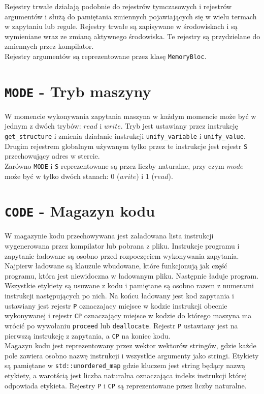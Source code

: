 Rejestry trwałe działają podobnie do rejestrów tymczasowych i rejestrów argumentów i służą do pamiętania zmiennych pojawiających się w wielu termach w zapytaniu lub regule. Rejestry trwałe są zapisywane w środowiskach i są wymieniane wraz ze zmianą aktywnego środowiska. Te rejestry są przydzielane do zmiennych przez kompilator.\\
Rejestry argumentów są reprezentowane przez klasę \texttt{MemoryBloc}.

\section{\texttt{MODE} - Tryb maszyny}

W momencie wykonywania zapytania maszyna w każdym momencie może być w jednym z dwóch trybów: $read$ i $write$. Tryb jest ustawiany przez instrukcję \texttt{get\_structure} i zmienia działanie instrukcji \texttt{unify\_variable} i \texttt{unify\_value}. Drugim rejestrem globalnym używanym tylko przez te instrukcje jest rejestr \texttt{S} przechowujący adres w stercie.\\
Zarówno \texttt{MODE} i \texttt{S} reprezentowane są przez liczby naturalne, przy czym $mode$ może być w tylko dwóch stanach: 0 ($write$) i 1 ($read$). 

\section{\texttt{CODE} - Magazyn kodu}

W magazynie kodu przechowywana jest załadowana lista instrukcji wygenerowana przez kompilator lub pobrana z pliku. Instrukcje programu i zapytanie ładowane są osobno przed rozpoczęciem wykonywania zapytania. Najpierw ładowane są klauzule wbudowane, które funkcjonują jak część programu, która jest niewidoczna w ładowanym pliku. Następnie ładuje program. Wszystkie etykiety są usuwane z kodu i pamiętane są osobno razem z numerami instrukcji następujących po nich. Na końcu ładowany jest kod zapytania i ustawiany jest rejestr \texttt{P} oznaczajacy miejsce w kodzie instrukcji obecnie wykonywanej i rejestr \texttt{CP} oznaczający miejsce w kodzie do którego maszyna ma wrócić po wywołaniu \texttt{proceed} lub \texttt{deallocate}. Rejestr \texttt{P} ustawiany jest na pierwszą instrukcję z zapytania, a \texttt{CP} na koniec kodu.\\
Magazyn kodu jest reprezentowany przez wektor wektorów stringów, gdzie każde pole zawiera osobno nazwę instrukcji i wszystkie argumenty jako stringi. Etykiety są pamiętane w \texttt{std::unordered\_map} gdzie kluczem jest string będący nazwą etykiety, a warotścią jest liczba naturalna oznaczająca indeks instrukcji której odpowiada etykieta. Rejestry \texttt{P} i \texttt{CP} są reprezentowane przez liczby naturalne.


